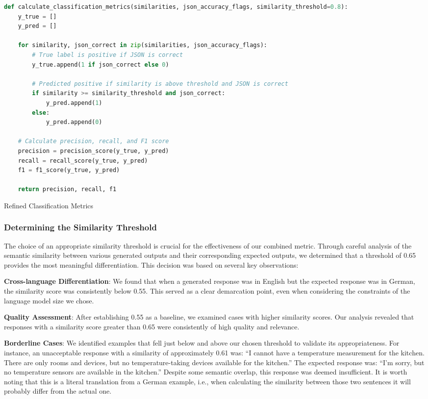 \begin{Listing}
    \begin{lstlisting}[language=Python]
    def calculate_classification_metrics(similarities, json_accuracy_flags, similarity_threshold=0.8):
    y_true = []
    y_pred = []

    for similarity, json_correct in zip(similarities, json_accuracy_flags):
        # True label is positive if JSON is correct
        y_true.append(1 if json_correct else 0)

        # Predicted positive if similarity is above threshold and JSON is correct
        if similarity >= similarity_threshold and json_correct:
            y_pred.append(1)
        else:
            y_pred.append(0)

    # Calculate precision, recall, and F1 score
    precision = precision_score(y_true, y_pred)
    recall = recall_score(y_true, y_pred)
    f1 = f1_score(y_true, y_pred)

    return precision, recall, f1
  \end{lstlisting}
    \caption{Refined Classification Metrics}
    \label{lst:classificationRefined}
\end{Listing}

\subsubsection{Determining the Similarity Threshold}
The choice of an appropriate similarity threshold is crucial for the effectiveness of our combined metric. Through careful analysis of the semantic similarity between various generated outputs and their corresponding expected outputs, we determined that a threshold of 0.65 provides the most meaningful differentiation. This decision was based on several key observations:

\textbf{Cross-language Differentiation}: We found that when a generated response was in English but the expected response was in German, the similarity score was consistently below 0.55. This served as a clear demarcation point, even when considering the constraints of the language model size we chose.

\textbf{Quality Assessment}: After establishing 0.55 as a baseline, we examined cases with higher similarity scores. Our analysis revealed that responses with a similarity score greater than 0.65 were consistently of high quality and relevance.

\textbf{Borderline Cases}: We identified examples that fell just below and above our chosen threshold to validate its appropriateness. For instance, an unacceptable response with a similarity of approximately 0.61 was: ``I cannot have a temperature measurement for the kitchen. There are only rooms and devices, but no temperature-taking devices available for the kitchen.'' The expected response was: ``I'm sorry, but no temperature sensors are available in the kitchen.'' Despite some semantic overlap, this response was deemed insufficient.
It is worth noting that this is a literal translation from a German example, i.e., when calculating the similarity between those two sentences it will probably differ from the actual one.

